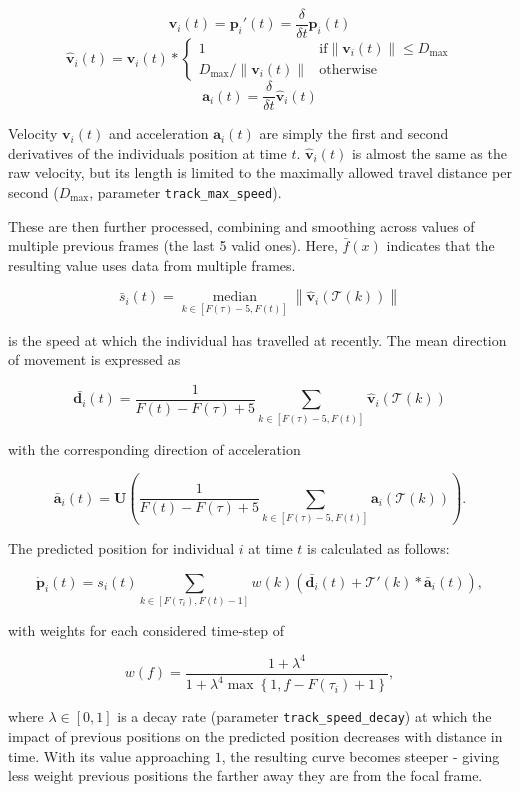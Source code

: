 \documentclass[9pt,lineno]{elife}
\newcommand{\norm}[1]{\left\lVert#1\right\rVert}
\newcommand*\mean[1]{\bar{#1}}
\newcommand{\Tau}{\mathcal{T}}
\DeclareMathOperator*{\median}{median}
\begin{document}
\begin{appendixbox}
$$ \mathbf{v}_i(t) = \mathbf{p}_i'(t) = \frac{\delta}{\delta t} \mathbf{p}_i(t) $$
$$ \hat{\mathbf{v}}_i(t) = \mathbf{v}_i(t) * \begin{cases} 1 & \mathrm{if} \norm{\mathbf{v}_i(t)} \le D_\mathrm{max} \\ D_\mathrm{max} / \norm{\mathbf{v}_i(t)} & \mathrm{otherwise} \end{cases} $$
$$ \mathbf{a}_i(t) = \frac{\delta}{\delta t} \hat{\mathbf{v}}_i(t) $$

Velocity $\mathbf{v}_i(t)$ and acceleration $\mathbf{a}_i(t)$ are simply the first and second derivatives of the individuals position at time $t$. $\hat{\mathbf{v}}_i(t)$ is almost the same as the raw velocity, but its length is limited to the maximally allowed travel distance per second ($D_\mathrm{max}$, parameter \texttt{track\_max\_speed}).

These are then further processed, combining and smoothing across values of multiple previous frames (the last 5 valid ones). Here, $\mean{f}(x)$ indicates that the resulting value uses data from multiple frames.
 
$$ \mean{s}_{i}(t) = \underset{k \in [F(\tau)-5, F(t)]}{\median} \norm{\hat{\mathbf{v}}_i(\Tau(k))} $$ %

is the speed at which the individual has travelled at recently. The mean direction of movement is expressed as

$$ \mean{\mathbf{d}_i}(t) = \frac{1}{F(t)-F(\tau)+5} \sum_{k \in [F(\tau)-5, F(t)]} \hat{\mathbf{v}}_i(\Tau(k)) $$ %

with the corresponding direction of acceleration

$$ \mean{\mathbf{a}}_i(t) = \mathbf{U}\left( \frac{1}{F(t)-F(\tau)+5} \sum_{k \in [F(\tau)-5, F(t)]} \mathbf{a}_i(\Tau(k)) \right) . $$

The predicted position for individual $i$ at time $t$ is calculated as follows:

$$ \dot{\mathbf{p}}_i(t) = s_i(t) \sum_{k\in [F(\tau_i), F(t)-1]} w(k) \left(\mean{\mathbf{d}_i}(t) + \Tau'(k) * \mean{\mathbf{a}}_i(t) \right) , $$

with weights for each considered time-step of

$$ w(f) = \frac{1 + \lambda^4}{1 + \lambda^4 \max\left\{ 1, f - F(\tau_i) + 1 \right\}} , $$

where $\lambda\in[0,1]$ is a decay rate (parameter \texttt{track\_speed\_decay}) at which the impact of previous positions on the predicted position decreases with distance in time. With its value approaching $1$, the resulting curve becomes steeper - giving less weight previous positions the farther away they are from the focal frame.


\end{appendixbox}
\end{document}
